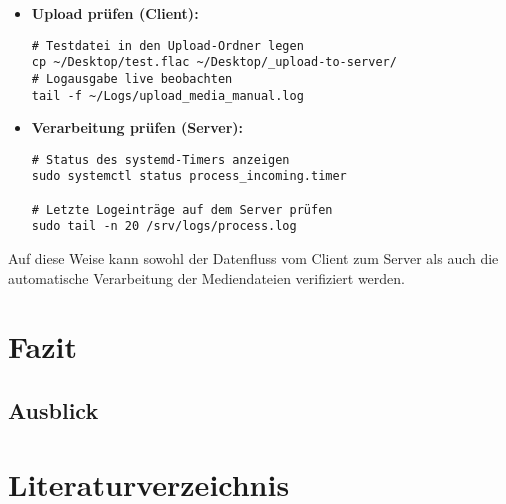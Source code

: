 \documentclass[12pt,a4paper]{report}
\begin{document}
    \begin{itemize}
      \item \textbf{Upload prüfen (Client):}
      \begin{verbatim}
# Testdatei in den Upload-Ordner legen
cp ~/Desktop/test.flac ~/Desktop/_upload-to-server/
# Logausgabe live beobachten
tail -f ~/Logs/upload_media_manual.log
      \end{verbatim}

      \item \textbf{Verarbeitung prüfen (Server):}
      \begin{verbatim}
# Status des systemd-Timers anzeigen
sudo systemctl status process_incoming.timer

# Letzte Logeinträge auf dem Server prüfen
sudo tail -n 20 /srv/logs/process.log
      \end{verbatim}
    \end{itemize}

    Auf diese Weise kann sowohl der Datenfluss vom Client zum Server als auch die automatische Verarbeitung der Mediendateien verifiziert werden.

   
\chapter*{Fazit}
\setcounter{section}{0}

\section{Ausblick}


\cleardoublepage
\chapter*{Literaturverzeichnis}
\printbibliography[heading=none]
\end{document}
